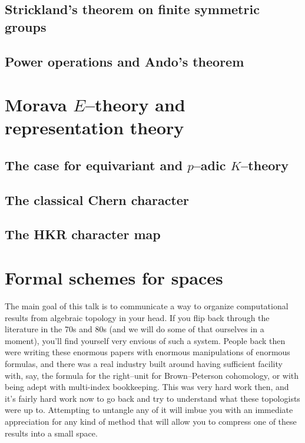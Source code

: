     \subsection{Strickland's theorem on finite symmetric groups}
    \subsection{Power operations and Ando's theorem}

\section{Morava $E$--theory and representation theory}
    \subsection{The case for equivariant and $p$--adic $K$--theory}
    \subsection{The classical Chern character}
    \subsection{The HKR character map}


\newpage

\section{Formal schemes for spaces}

The main goal of this talk is to communicate a way to organize computational results from algebraic topology in your head.  If you flip back through the literature in the 70s and 80s (and we will do some of that ourselves in a moment), you'll find yourself very envious of such a system.  People back then were writing these enormous papers with enormous manipulations of enormous formulas, and there was a real industry built around having sufficient facility with, say, the formula for the right--unit for Brown--Peterson cohomology, or with being adept with multi-index bookkeeping.  This was very hard work then, and it's fairly hard work now to go back and try to understand what these topologists were up to.  Attempting to untangle any of it will imbue you with an immediate appreciation for any kind of method that will allow you to compress one of these results into a small space.

